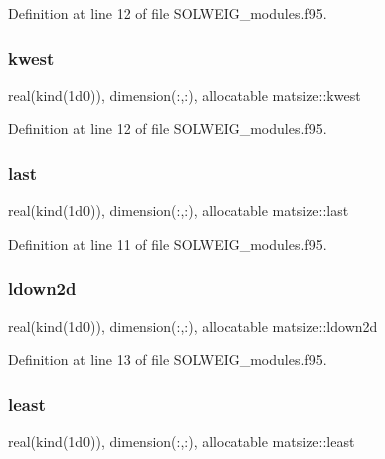 Definition at line 12 of file S\+O\+L\+W\+E\+I\+G\+\_\+modules.\+f95.

\mbox{\label{namespacematsize_ac52a8cfa3a58b4aff078294cbdb70ed5}} 
\subsubsection{\texorpdfstring{kwest}{kwest}}
{\footnotesize\ttfamily real(kind(1d0)), dimension(\+:,\+:), allocatable matsize\+::kwest}



Definition at line 12 of file S\+O\+L\+W\+E\+I\+G\+\_\+modules.\+f95.

\mbox{\label{namespacematsize_ab5b5bdd8732edafafedd05776e25e011}} 
\subsubsection{\texorpdfstring{last}{last}}
{\footnotesize\ttfamily real(kind(1d0)), dimension(\+:,\+:), allocatable matsize\+::last}



Definition at line 11 of file S\+O\+L\+W\+E\+I\+G\+\_\+modules.\+f95.

\mbox{\label{namespacematsize_aaf966c70b77fe5646eb3ca89701232e8}} 
\subsubsection{\texorpdfstring{ldown2d}{ldown2d}}
{\footnotesize\ttfamily real(kind(1d0)), dimension(\+:,\+:), allocatable matsize\+::ldown2d}



Definition at line 13 of file S\+O\+L\+W\+E\+I\+G\+\_\+modules.\+f95.

\mbox{\label{namespacematsize_aa87a43379aac21f08eec99b01c93823a}} 
\subsubsection{\texorpdfstring{least}{least}}
{\footnotesize\ttfamily real(kind(1d0)), dimension(\+:,\+:), allocatable matsize\+::least}




